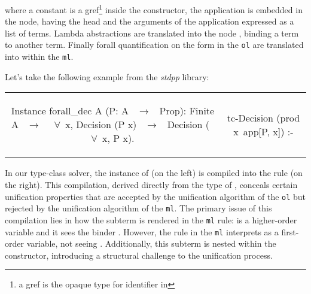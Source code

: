 \documentclass[acmengage]{acmart}
\def\elpi{\proglang{elpi}}
\def\coq{\proglang{coq}}
\newcommand{\library}[1]{\textit{#1}\xspace}
\def\stdpp{\library{stdpp}}
\newcommand*{\acronym}[1]{\texttt{#1}\xspace}
\def\ol{\acronym{ol}} %
\def\ml{\acronym{ml}} %
\begin{document}
   
\noindent where a \coq constant is a gref\footnote{a gref is the opaque type for \coq
identifier in \elpi} inside the  constructor, the \coq application
is embedded in the  node, having the head and the arguments of the
application expressed as a list of terms. Lambda abstractions are translated
into the node , binding a term to another term. Finally forall
quantification on the form  in the \ol are translated
into  within the \ml.


Let's take the following example from the \stdpp library:

\noindent %
\begin{tabular}{c|c}
  \begin{minipage}[c]{0.50\linewidth}
    \begin{coqcode}
      Instance forall_dec A (P: A ~$\to$~ Prop):
        Finite A ~$\to$~ 
        ~$\forall$~x, Decision (P x) ~$\to$~
        Decision (~$\forall$~x, P x).
    \end{coqcode}
  \end{minipage}
  &
  \begin{minipage}[c]{0.46\linewidth}
    \begin{elpicode}
      tc-Decision (prod x\ app[P, x]) :- 
    \end{elpicode}
  \end{minipage}
\end{tabular}

\noindent In our type-class solver, the  instance 
of \coq (on the left) is compiled into the \elpi rule (on the right). This 
compilation, derived
directly from the type of , conceals certain unification
properties that are accepted by the unification algorithm of the \ol but 
rejected by the unification algorithm of the \ml. The primary issue of this
compilation lies in how the subterm  is rendered in
the \ml rule:  is a higher-order variable and it
sees the binder . However, the rule in the \ml interprets  as a 
first-order variable, not seeing . Additionally, this subterm is
nested within the  constructor, introducing a structural challenge 
to the unification process.
\end{document}
